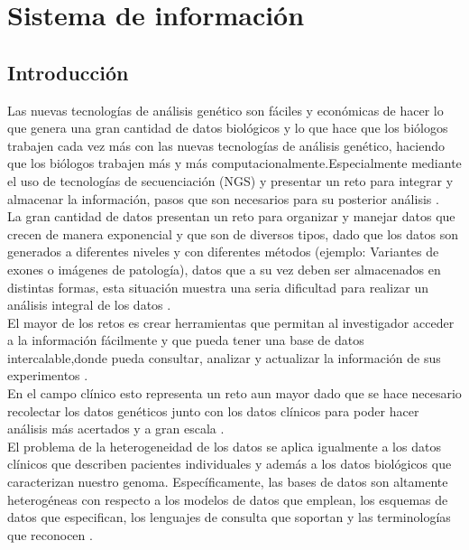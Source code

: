\chapter{Sistema de información}
\section{Introducción}

Las nuevas tecnologías de análisis genético son fáciles y económicas de hacer lo que genera una gran cantidad de datos biológicos y lo que hace que los biólogos trabajen cada vez más con las nuevas tecnologías de análisis genético, haciendo que los biólogos trabajen más y más computacionalmente.Especialmente mediante el uso de  tecnologías de secuenciación (NGS) y presentar un reto para integrar y almacenar la información, pasos que son necesarios para su posterior análisis \cite{Li2014,Cook2016}.\\

La gran cantidad de datos presentan un reto para organizar y manejar datos que crecen de manera exponencial y que son de diversos tipos, dado que los datos son generados a diferentes niveles y con diferentes métodos (ejemplo: Variantes de exones o imágenes de patología), datos que a su vez deben ser almacenados en distintas formas, esta situación muestra una seria dificultad para realizar un análisis integral de los datos \cite{Cook2016,Li2014}.\\

El mayor de los retos es crear herramientas que permitan al investigador acceder a la información fácilmente y que pueda tener una base de datos intercalable,donde pueda consultar, analizar y actualizar la información de sus experimentos \cite{Li2014}.\\

En el campo clínico esto representa un reto aun mayor dado que se hace necesario recolectar los datos genéticos junto con los datos clínicos para poder hacer análisis más acertados y a gran escala \cite{Paila2013}.\\

El problema de la heterogeneidad  de los datos  se aplica igualmente a los datos clínicos que describen pacientes individuales y además a los datos biológicos que caracterizan nuestro genoma. Específicamente, las bases de datos son altamente heterogéneas con respecto a los modelos de datos que emplean, los esquemas de datos que especifican, los lenguajes de consulta que soportan y las terminologías que reconocen \cite{Sujansky2001}.\\

